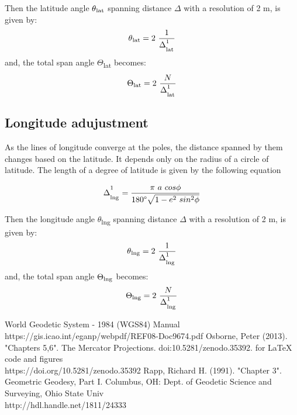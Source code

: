 \documentclass[conference]{IEEEtran}
\begin{document}
Then the latitude angle $\theta\textsubscript{lat}$ spanning distance $\Delta$ with a resolution of 2 m, is given by:
\begin{equation}\theta\textsubscript{lat} = 2 \ \frac{1}{\Delta^\textsuperscript{1}_\textsubscript{lat}}\end{equation}
and, the total span angle $\Theta$\textsubscript{lat} becomes:
\begin{equation}\Theta\textsubscript{lat} = 2 \ \frac{N}{\Delta^\textsuperscript{1}_\textsubscript{lat}}\end{equation}

\subsection{Longitude adujustment}
As the lines of longitude converge at the poles, the distance spanned by them changes based on the latitude. It depends only on the radius of a circle of latitude. The length of a degree of latitude is given by the following equation\cite{b3}

\begin{equation}\Delta^\textsuperscript{1}_\textsubscript{lng}=\frac{\pi \ a \ cos\phi} {180\degree \sqrt{1-e\textsuperscript{2} \ sin\textsuperscript{2}\phi}}\end{equation}

Then the longitude angle $\theta$\textsubscript{lng} spanning distance $\Delta$ with a resolution of 2 m, is given by:
\begin{equation}\theta\textsubscript{lng} = 2 \ \frac{1}{\Delta^\textsuperscript{1}_\textsubscript{lng}}\end{equation}
and, the total span angle $\Theta\textsubscript{lng}$ becomes:
\begin{equation}\Theta\textsubscript{lng} = 2 \ \frac{N}{\Delta^\textsuperscript{1}_\textsubscript{lng}}\end{equation}

\begin{thebibliography}{1}
  World Geodetic System - 1984 (WGS84) Manual\\
https://gis.icao.int/eganp/webpdf/REF08-Doc9674.pdf
 Osborne, Peter (2013). "Chapters 5,6". The Mercator Projections. doi:10.5281/zenodo.35392. for LaTeX code and figures \\
https://doi.org/10.5281/zenodo.35392
 Rapp, Richard H. (1991). "Chapter 3". Geometric Geodesy, Part I. Columbus, OH: Dept. of Geodetic Science and Surveying, Ohio State Univ \\
http://hdl.handle.net/1811/24333
\end{thebibliography}
\end{document}
